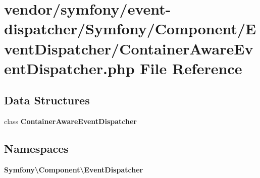 \section{vendor/symfony/event-\/dispatcher/\+Symfony/\+Component/\+Event\+Dispatcher/\+Container\+Aware\+Event\+Dispatcher.php File Reference}
\label{_container_aware_event_dispatcher_8php}
\subsection*{Data Structures}
\begin{DoxyCompactItemize}
\item 
class {\bf Container\+Aware\+Event\+Dispatcher}
\end{DoxyCompactItemize}
\subsection*{Namespaces}
\begin{DoxyCompactItemize}
\item 
 {\bf Symfony\textbackslash{}\+Component\textbackslash{}\+Event\+Dispatcher}
\end{DoxyCompactItemize}

